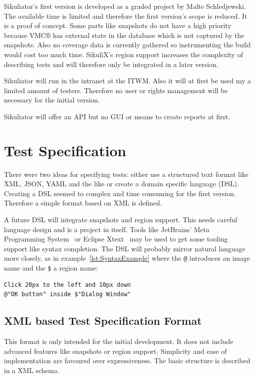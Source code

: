 \documentclass[a4paper,twocolumn,twoside]{article}
\newcommand{\VMC}[0]{VMC®}
\newcommand{\Sik}[0]{Sikuliator}
\begin{document}
\Sik{}'s first version is developed as a graded project by Malte Schledjewski.
The available time is limited and therefore the first version's scope is reduced.
It is a proof of concept.
Some parts like snapshots do not have a high priority because \VMC{} has external state in the database which is not captured by the snapshots. 
Also no coverage data is currently gathered so instrumenting the build would cost too much time. 
SikuliX's region support increases the complexity of describing tests and will therefore only be integrated in a later version.

\Sik{} will run in the intranet at the ITWM.
Also it will at first be used my a limited amount of testers.
Therefore no user or rights management will be necessary for the initial version.

\Sik{} will offer an API but no GUI or means to create reports at first.



\section{Test Specification}
There were two ideas for specifying tests: either use a structured text format like XML, JSON, YAML and the like or create a domain specific language (DSL).
Creating a DSL seemed to complex and time consuming for the first version.
Therefore a simple format based on XML is defined.

A future DSL will integrate snapshots and region support.
This needs careful language design and is a project in itself.
Tools like JetBrains' Meta Programming System~\cite{MPS}
or Eclipse Xtext~\cite{Xtext} may be used to get some tooling support like syntax completion.
The DSL will probably mirror natural language more closely, 
as in example~\ref{lst:SyntaxExample} where the \texttt{@} introduces an image name and the \texttt{\$} a region name:

\renewcommand{\lstlistingname}{Example}
\begin{lstlisting}[language=Pseudo,caption={Example for possible syntax},label={lst:SyntaxExample}]
Click 20px to the left and 10px down 
@"OK button" inside $"Dialog Window"
\end{lstlisting}

\subsection*{XML based Test Specification Format}
This format is only intended for the initial development.
It does not include advanced features like snapshots or region support.
Simplicity and ease of implementation are favoured over expressiveness.
The basic structure is described in a XML schema.
\end{document}
